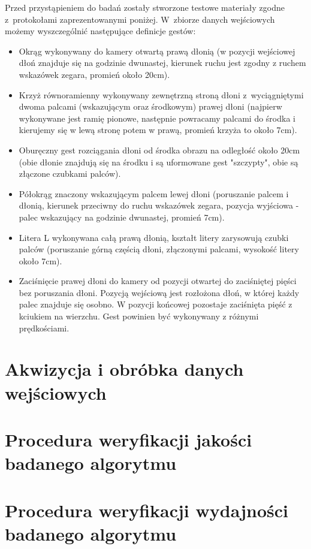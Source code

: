 Przed przystąpieniem do badań zostały stworzone testowe materiały zgodne z~protokołami zaprezentowanymi poniżej. W~zbiorze danych wejściowych możemy wyszczególnić następujące definicje gestów:

\begin{itemize}
  \item Okrąg wykonywany do kamery otwartą prawą dłonią (w pozycji wejściowej dłoń znajduje się na godzinie dwunastej, kierunek ruchu jest zgodny z ruchem wskazówek zegara, promień około 20cm).
  \item Krzyż równoramienny wykonywany zewnętrzną stroną dłoni z~wyciągniętymi dwoma palcami (wskazującym oraz środkowym) prawej dłoni (najpierw wykonywane jest ramię pionowe, następnie powracamy palcami do środka i kierujemy się w lewą stronę potem w prawą, promień krzyża to około 7cm).
  \item Oburęczny gest rozciągania dłoni od środka obrazu na odległość około 20cm (obie dłonie znajdują się na środku i są uformowane gest "szczypty", obie są złączone czubkami palców).
  \item Półokrąg znaczony wskazującym palcem lewej dłoni (poruszanie palcem i dłonią, kierunek przeciwny do ruchu wskazówek zegara, pozycja wyjściowa - palec wskazujący na godzinie dwunastej, promień 7cm).
  \item Litera L wykonywana całą prawą dłonią, kształt litery zarysowują czubki palców (poruszanie górną częścią dłoni, złączonymi palcami, wysokość litery około 7cm).
  \item Zaciśnięcie prawej dłoni do kamery od pozycji otwartej do zaciśniętej pięści bez poruszania dłoni. Pozycją wejściową jest rozłożona dłoń, w której każdy palec znajduje się osobno. W pozycji końcowej pozostaje zaciśnięta pięść z kciukiem na wierzchu. Gest powinien być wykonywany z różnymi prędkościami.
\end{itemize}

\section{Akwizycja i obróbka danych wejściowych}\label{Section_DefinicjeGestow}

\section{Procedura weryfikacji jakości badanego algorytmu}\label{Section_Jakosc}

\section{Procedura weryfikacji wydajności badanego algorytmu}\label{Section_Wydajnosc}

